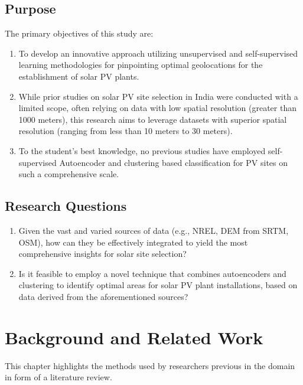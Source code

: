 \documentclass[a4paper,12pt]{Classes/RoboticsLaTeX}
\begin{document}
	
	\section{Purpose}

	The primary objectives of this study are:

	\begin{enumerate}
		\item To develop an innovative approach utilizing unsupervised and self-supervised learning methodologies for pinpointing optimal geolocations for the establishment of solar PV plants.
		
		\item While prior studies on solar PV site selection in India were conducted with a limited scope, often relying on data with low spatial resolution (greater than 1000 meters), this research aims to leverage datasets with superior spatial resolution (ranging from less than 10 meters to 30 meters).
		
		\item To the student's best knowledge, no previous studies have employed self-supervised Autoencoder and clustering based classification for \ac{PV} sites on such a comprehensive scale.
	\end{enumerate}

	\section{Research Questions}

	\begin{enumerate}
		\item Given the vast and varied sources of data (e.g., \ac{NREL}, \ac{DEM} from \ac{SRTM}, \ac{OSM}), how can they be effectively integrated to yield the most comprehensive insights for solar site selection?
		\item Is it feasible to employ a novel technique that combines autoencoders and clustering to identify optimal areas for solar PV plant installations, based on data derived from the aforementioned sources?
	\end{enumerate}

	\chapter{Background and Related Work}

	This chapter highlights the methods used by researchers previous in the domain in form of a literature review.
	
\end{document}
